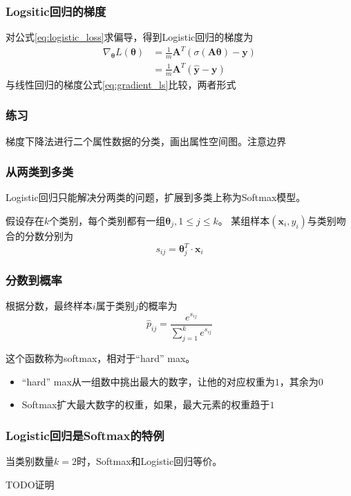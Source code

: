 \documentclass[14pt]{beamer}
\newcommand{\mat}[1]{\bm{#1}}
\renewcommand{\vec}[1]{\bm{#1}}
\newcommand{\MA}{\mat{A}}
\newcommand{\Vy}{\vec{y}}
\newcommand{\Vx}{\vec{x}}
\newcommand{\Vt}{\vec{\theta}}
\let\emph\relax %
\begin{document}
\begin{frame}
  \frametitle{Logsitic回归的梯度}
  对公式\ref{eq:logistic_loss}求偏导，得到Logistic回归的梯度为
  \begin{equation}
    \begin{split}
    \nabla_{\Vt}L(\Vt)&=\frac{1}{m}\MA^T(\sigma(\MA\Vt)-\Vy)\\
    &=\frac{1}{m}\MA^T(\hat{\Vy}-\Vy)
    \end{split}
  \end{equation}
  与线性回归的梯度公式\ref{eq:gradient_ls}比较，两者形式\emph{高度相似}

\end{frame}

\begin{frame}
  \frametitle{练习}
  梯度下降法进行二个属性数据的分类，画出属性空间图。注意边界
  
\end{frame}

\begin{frame}
  \frametitle{从两类到多类}
  Logistic回归只能解决分两类的问题，扩展到多类上称为Softmax模型。

  假设存在$k$个类别，每个类别都有一组\emph{打分系数}$\Vt_j,1\leq j\leq k$。
  某组样本$(\Vx_i, y_i)$与类别吻合的分数分别为
  \begin{equation}
    s_{ij}=\Vt_j^T\cdot\Vx_i
  \end{equation}
\end{frame}

\begin{frame}
  \frametitle{分数到概率}
  根据分数，最终样本$i$属于类别$j$的概率为
  \begin{equation}
    \hat{p}_{ij}=\frac{e^{s_{ij}}}{\sum_{j=1}^k e^{s_{ij}}}
  \end{equation}

  这个函数称为softmax，相对于“hard” max。
  \begin{itemize}
    \item “hard” max从一组数中挑出最大的数字，让他的对应权重为$1$，其余为$0$
    \item Softmax扩大最大数字的权重，如果\emph{反复应用}，最大元素的权重趋于$1$
  \end{itemize}
\end{frame}

\begin{frame}
  \frametitle{Logistic回归是Softmax的特例}
  当类别数量$k=2$时，Softmax和Logistic回归等价。

  TODO证明
\end{frame}
\end{document}

